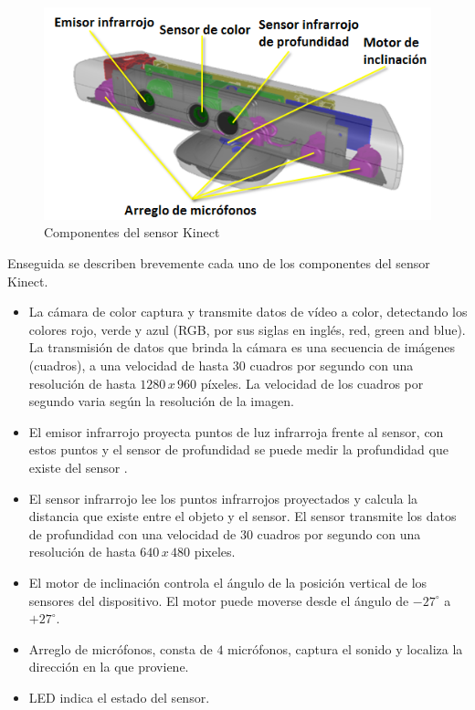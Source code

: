 \begin{figure}[!h]
\begin{center}
\includegraphics[scale=.6]{./Figures/sensor.png}
\end{center}
\caption{Componentes del sensor Kinect}
\label{fig:KinectComponentes}
\end{figure} 

Enseguida se describen brevemente cada uno de los componentes del sensor Kinect. 
\begin{itemize}
\item La cámara de color captura y transmite datos de vídeo a color, detectando los colores rojo, verde y azul (RGB, por sus siglas en ingl\'es, red, green and blue). La transmisión de datos que brinda la cámara es una secuencia de imágenes (cuadros), a una velocidad de hasta $30$ cuadros por segundo con una resolución de hasta $1280\, x \, 960$ p\'ixeles. La velocidad de los cuadros por segundo varia según la resolución de la imagen.  
\item El emisor infrarrojo proyecta puntos de luz infrarroja frente al sensor, con estos puntos y el sensor de profundidad se puede medir la profundidad que existe del sensor .
\item El sensor infrarrojo lee los puntos infrarrojos proyectados y calcula la distancia que existe entre el objeto y el sensor. El sensor transmite los datos de profundidad con una velocidad de $30$ cuadros por segundo con una resolución de hasta $640 \, x \, 480$ pixeles.   
\item El motor de inclinación controla el \'angulo de la posición vertical de los sensores del dispositivo. El motor puede moverse desde el \'angulo de $-27^ \circ$ a $+27^\circ$. 
\item Arreglo de micrófonos, consta de $4$ micrófonos, captura el sonido y localiza la dirección en la que proviene. 
\item LED indica el estado del sensor.
 
\end{itemize}


